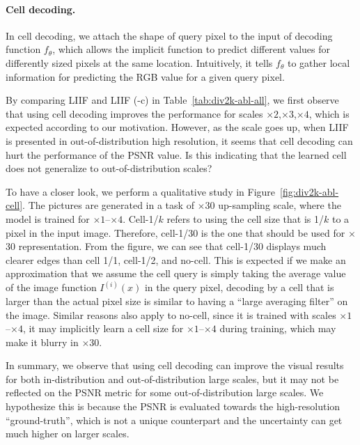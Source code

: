 \documentclass[final]{cvpr}
\begin{document}
\paragraph{Cell decoding.} In cell decoding, we attach the shape of query pixel to the input of decoding function $f_\theta$, which allows the implicit function to predict different values for differently sized pixels at the same location. Intuitively, it tells $f_\theta$ to gather local information for predicting the RGB value for a given query pixel.

By comparing LIIF and LIIF (-c) in Table~\ref{tab:div2k-abl-all}, we first observe that using cell decoding improves the performance for scales $\times2$,$\times3$,$\times4$, which is expected according to our motivation. However, as the scale goes up, when LIIF is presented in out-of-distribution high resolution, it seems that cell decoding can hurt the performance of the PSNR value. Is this indicating that the learned cell does not generalize to out-of-distribution scales?

To have a closer look, we perform a qualitative study in Figure~\ref{fig:div2k-abl-cell}. The pictures are generated in a task of $\times30$ up-sampling scale, where the model is trained for $\times1$--$\times4$. Cell-1/$k$ refers to using the cell size that is 1/$k$ to a pixel in the input image. Therefore, cell-1/30 is the one that should be used for $\times$30 representation. From the figure, we can see that cell-1/30 displays much clearer edges than cell 1/1, cell-1/2, and no-cell. This is expected if we make an approximation that we assume the cell query is simply taking the average value of the image function $I^{(i)}(x)$ in the query pixel, decoding by a cell that is larger than the actual pixel size is similar to having a ``large averaging filter'' on the image. Similar reasons also apply to no-cell, since it is trained with scales $\times1$--$\times4$, it may implicitly learn a cell size for $\times1$--$\times4$ during training, which may make it blurry in $\times 30$.

In summary, we observe that using cell decoding can improve the visual results for both in-distribution and out-of-distribution large scales, but it may not be reflected on the PSNR metric for some out-of-distribution large scales. We hypothesize this is because the PSNR is evaluated towards the high-resolution ``ground-truth'', which is not a unique counterpart and the uncertainty can get much higher on larger scales.

\vspace{-1em}
\end{document}
